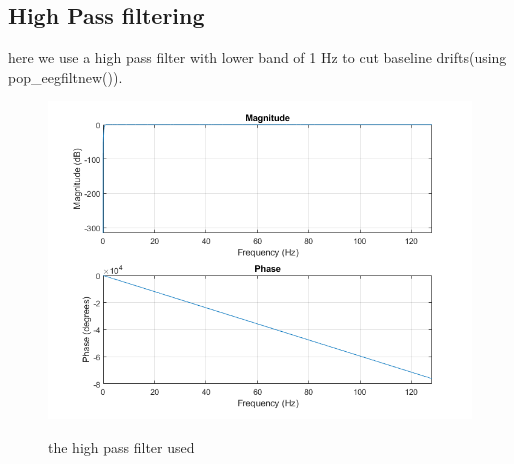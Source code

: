 \documentclass[11pt]{article}
\begin{document}
\subsection{High Pass filtering}
here we use a high pass filter with lower band of 1 Hz to cut
baseline drifts(using pop\_eegfiltnew()). \\

\begin{figure}[H]
    \begin{center}
        \includegraphics[scale=0.6]{Fig/hpf.png}
        \label{fig:hpf}
        \caption{the high pass filter used}
    \end{center}
\end{figure}
\end{document}
